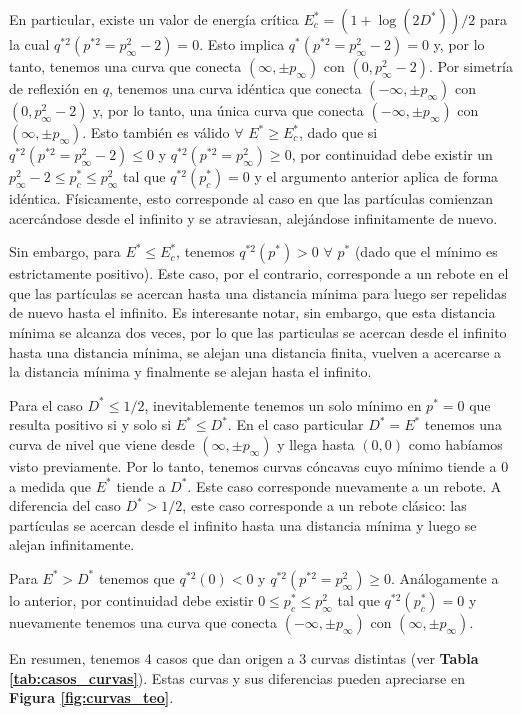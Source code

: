 En particular, existe un valor de energía crítica $E^*_c = (1+\log(2D^*))/2$ para la cual $q^{*2}(p^{*2}=p^2_\infty-2) = 0$. 
Esto implica $q^*(p^{*2}=p^2_\infty-2)=0$ y, por lo tanto, tenemos una curva que conecta $(\infty, \pm p_\infty)$ con $(0,p^2_\infty-2)$.
Por simetría de reflexión en $q$, tenemos una curva idéntica que conecta $(-\infty, \pm p_\infty)$ con $(0,p^2_\infty-2)$ y, por lo tanto, una única curva que conecta $(-\infty, \pm p_\infty)$ con $(\infty, \pm p_\infty)$.
Esto también es válido $\forall$ $E^*\geq E^*_c$, dado que si $q^{*2}(p^{*2}=p_\infty^2-2)\leq 0$ y $q^{*2}(p^{*2}=p_\infty^2)\geq 0$, por continuidad debe existir un $p_\infty^2-2\leq p^*_c\leq p_\infty^2$  tal que $q^{*2}(p^*_c) = 0$ y el argumento anterior aplica de forma idéntica.
Físicamente, esto corresponde al caso en que las partículas comienzan acercándose desde el infinito y se atraviesan, alejándose infinitamente de nuevo. 

Sin embargo, para $E^*\leq E^*_c$, tenemos $q^{*2}(p^*) > 0$  $\forall$ $p^*$ (dado que el mínimo es estrictamente positivo).
Este caso, por el contrario, corresponde a un rebote en el que las partículas se acercan hasta una distancia mínima para luego ser repelidas de nuevo hasta el infinito. 
Es interesante notar, sin embargo, que esta distancia mínima se alcanza dos veces, por lo que las particulas se acercan desde el infinito hasta una distancia mínima, se alejan una distancia finita, vuelven a acercarse a la distancia mínima y finalmente se alejan hasta el infinito.

Para el caso $D^*\leq 1/2$, inevitablemente tenemos un solo mínimo en $p^*=0$ que resulta positivo si y solo si $E^*\leq D^*$. 
En el caso particular $D^*=E^*$ tenemos una curva de nivel que viene desde $(\infty,\pm p_\infty)$ y llega hasta $(0,0)$ como habíamos visto previamente.
Por lo tanto, tenemos curvas cóncavas cuyo mínimo tiende a $0$ a medida que $E^*$ tiende a $D^*$.
Este caso corresponde nuevamente a un rebote.
A diferencia del caso $D^*>1/2$, este caso corresponde a un rebote clásico: las partículas se acercan desde el infinito hasta una distancia mínima y luego se alejan infinitamente.

Para $E^*>D^*$ tenemos que $q^{*2}(0) < 0$ y $q^{*2}(p^{*2}=p_\infty^2)\geq 0$. 
Análogamente a lo anterior, por continuidad debe existir $0\leq p^*_c\leq p_\infty^2$ tal que $q^{*2}(p^*_c) = 0$ y nuevamente tenemos una curva que conecta $(-\infty, \pm p_\infty)$ con $(\infty, \pm p_\infty)$. 

En resumen, tenemos 4 casos que dan origen a 3 curvas distintas (ver \textbf{Tabla \ref{tab:casos_curvas}}).
Estas curvas y sus diferencias pueden apreciarse en \textbf{Figura \ref{fig:curvas_teo}}.

